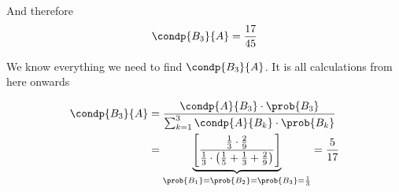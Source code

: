 \documentclass[14pt,fleqn]{extarticle}
\begin{document}
\begin{problem}
\begin{step}
\begin{options}
            And therefore 
       \[ \condp{B_3}{A} = \frac{17}{45} \]
        
    \end{options} 
     \reason 
       
     We know everything we need to find $\condp{B_3}{A}$. It is all 
     calculations from here onwards
     
     \begin{align}
	\condp{B_3}{A} &= \dfrac{\condp{A}{B_3}\cdot \prob{B_3}}{\sum_{k=1}^3 \condp{A}{B_k}\cdot \prob{B_k}} \\
	&= \underbrace{\left[\dfrac{\frac{1}{3}\cdot \frac{2}{9}}{\frac{1}{3}\cdot \left(\frac{1}{5}+\frac{1}{3}+\frac{2}{9} \right)} \right]}_{\prob{B_1}=\prob{B_2} = \prob{B_3} = \frac{1}{3}} = \frac{5}{17}
\end{align}  
\end{step}

\end{problem} 
\end{document}
